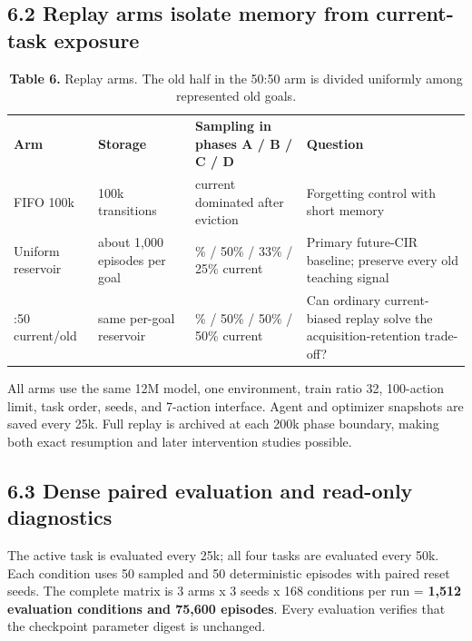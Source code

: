 \documentclass[10pt,a4paper]{article}
\newcommand{\reportsubsection}[1]{\subsection{\textcolor{brandblue}{#1}}}
\begin{document}
\begin{center}
\end{center}
\reportsubsection{6.2 Replay arms isolate memory from current-task exposure}
\begin{table}[H]
\centering
\begingroup
\footnotesize
\setlength{\tabcolsep}{3.5pt}
\renewcommand{\arraystretch}{1.15}
\begin{tabularx}{\textwidth}{@{} >{\hsize=0.710\hsize\RaggedRight\arraybackslash}X >{\hsize=0.788\hsize\RaggedRight\arraybackslash}X >{\hsize=1.068\hsize\RaggedRight\arraybackslash}X >{\hsize=1.435\hsize\RaggedRight\arraybackslash}X @{}}
\rowcolor{brandblue}
\color{white}\textbf{Arm} & \color{white}\textbf{Storage} & \color{white}\textbf{Sampling in phases A / B / C / D} & \color{white}\textbf{Question} \\
FIFO 100k & 100k transitions & current dominated after eviction & Forgetting control with short memory \\
\rowcolor{rowgray}
Uniform reservoir & about 1,000 episodes per goal & 100\% / 50\% / 33\% / 25\% current & Primary future-CIR baseline; preserve every old teaching signal \\
50:50 current/old & same per-goal reservoir & 100\% / 50\% / 50\% / 50\% current & Can ordinary current-biased replay solve the acquisition-retention trade-off? \\
\bottomrule
\end{tabularx}
\endgroup
\caption*{\textbf{Table 6.} Replay arms. The old half in the 50:50 arm is divided uniformly among represented old goals.}
\end{table}
All arms use the same 12M model, one environment, train ratio 32, 100-action limit, task order, seeds, and 7-action interface. Agent and optimizer snapshots are saved every 25k. Full replay is archived at each 200k phase boundary, making both exact resumption and later intervention studies possible.

\reportsubsection{6.3 Dense paired evaluation and read-only diagnostics}
The active task is evaluated every 25k; all four tasks are evaluated every 50k. Each condition uses 50 sampled and 50 deterministic episodes with paired reset seeds. The complete matrix is 3 arms x 3 seeds x 168 conditions per run = \textbf{1,512 evaluation conditions and 75,600 episodes}. Every evaluation verifies that the checkpoint parameter digest is unchanged.
\end{document}
